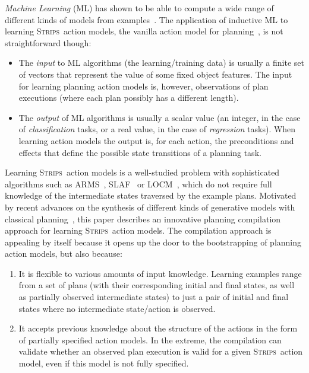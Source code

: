 \documentclass[runningheads]{llncs}
\newcommand{\strips}{\textsc{Strips}}     %
\begin{document}
{\em Machine Learning} (ML) has shown to be able to compute a wide range of different kinds of models from examples~\cite{michalski2013machine}. The application of inductive ML to learning \strips\ action models, the vanilla action model for planning~\cite{fikes1971strips}, is not straightforward though:
\begin{itemize}
\item The {\em input} to ML algorithms (the learning/training data) is usually a finite set of vectors that represent the value of some fixed object features. The input for learning planning action models is, however, observations of plan executions (where each plan possibly has a different length).
\item The {\em output} of ML algorithms is usually a scalar value (an integer, in the case of {\em classification} tasks, or a real value, in the case of {\em regression} tasks). When learning action models the output is, for each action, the preconditions and effects that define the possible state transitions of a planning task.
\end{itemize}

Learning \strips\ action models is a well-studied problem with sophisticated algorithms such as {\sc ARMS}~\cite{yang2007learning}, {\sc SLAF}~\cite{amir:alearning:JAIR08} or {\sc LOCM}~\cite{cresswell2013acquiring}, which do not require full knowledge of the intermediate states traversed by the example plans. Motivated by recent advances on the synthesis of different kinds of generative models with classical planning~\cite{bonet2009automatic,segovia2016hierarchical,segovia2017generating}, this paper describes an innovative planning compilation approach for learning \strips\ action models. The compilation approach is appealing by itself because it opens up the door to the bootstrapping of planning action models, but also because:

\begin{enumerate}
\item It is flexible to various amounts of input knowledge. Learning examples range from a set of plans (with their corresponding initial and final states, as well as partially observed intermediate states) to just a pair of initial and final states where no intermediate state/action is observed.
\item It accepts previous knowledge about the structure of the actions in the form of partially specified action models. In the extreme, the compilation can validate whether an observed plan execution is valid for a given \strips\ action model, even if this model is not fully specified.
\end{enumerate}
\end{document}
